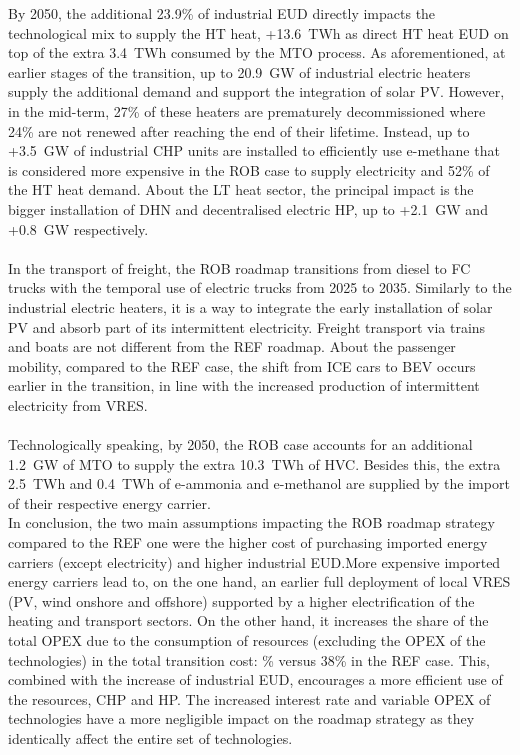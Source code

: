By 2050, the additional 23.9\% of industrial \gls{EUD} directly impacts the technological mix to supply the \gls{HT} heat, \ie +13.6~TWh as direct \gls{HT} heat \gls{EUD} on top of the extra 3.4~TWh consumed by the \gls{MTO} process. As aforementioned, at earlier stages of the transition, up to 20.9~GW of industrial electric heaters supply the additional demand and support the integration of solar \gls{PV}.  However, in the mid-term, 27\% of these heaters are prematurely decommissioned where 24\% are not renewed after reaching the end of their lifetime. Instead, up to +3.5~GW of industrial \gls{CHP} units are installed to efficiently use e-methane that is considered more expensive in the ROB case to supply electricity and 52\% of the \gls{HT} heat demand. About the \gls{LT} heat sector, the principal impact is the bigger installation of \gls{DHN} and decentralised electric \gls{HP}, up to +2.1~GW and +0.8~GW respectively. \\

\\

In the transport of freight, the ROB roadmap transitions from diesel to \gls{FC} trucks with the temporal use of electric trucks from 2025 to 2035. Similarly to the industrial electric heaters, it is a way to integrate the early installation of solar \gls{PV} and absorb part of its intermittent electricity. Freight transport via trains and boats are not different from the REF roadmap. About the passenger mobility, compared to the REF case, the shift from \gls{ICE} cars to \gls{BEV} occurs earlier in the transition, in line with the increased production of intermittent electricity from \gls{VRES}. \\

\\

Technologically speaking, by 2050, the ROB case accounts for an additional 1.2~GW of \gls{MTO} to supply the extra 10.3~TWh of \gls{HVC}. Besides this, the extra 2.5~TWh and 0.4~TWh of e-ammonia and e-methanol are supplied by the import of their respective energy carrier.\\

In conclusion, the two main assumptions impacting the ROB roadmap strategy compared to the REF one were the higher cost of purchasing imported energy carriers (except electricity) and higher industrial \gls{EUD}.More expensive imported energy carriers lead to, on the one hand, an earlier full deployment of local \gls{VRES} (\ie \gls{PV}, wind onshore and offshore) supported by a higher electrification of the heating and transport sectors.  On the other hand, it increases the share of the total OPEX due to the consumption of resources (\ie excluding the OPEX of the technologies) in the total transition cost: \% versus 38\% in the REF case. This, combined with the increase of industrial \gls{EUD}, encourages a more efficient use of the resources, \ie \gls{CHP} and \gls{HP}. The increased interest rate and variable OPEX of technologies have a more negligible impact on the roadmap strategy as they identically affect the entire set of technologies.

